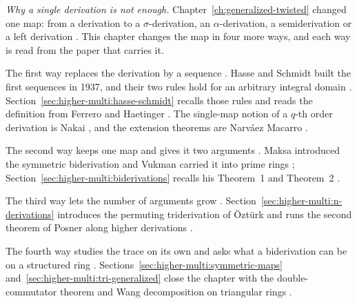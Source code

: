 \emph{Why a single derivation is not enough.} Chapter~\ref{ch:generalized-twisted}
changed one map: from a derivation to a $\sigma$-derivation, an
$\alpha$-derivation, a semiderivation or a left derivation
\cite[p.~2841]{Chuang2017Auto}. This chapter changes the map in four more
ways, and each way is read from the paper that carries it.


The first way replaces the derivation by a sequence
\cite[p.~2323]{FerreroHaetinger2002}. Hasse and Schmidt built the first
sequences in 1937, and their two rules hold for an arbitrary integral domain
\cite[p.~224]{HasseSchmidt1937}. Section~\ref{sec:higher-multi:hasse-schmidt}
recalls those rules and reads the definition from Ferrero and Haetinger
\cite[p.~2323]{FerreroHaetinger2002}. The single-map notion of a $q$-th order
derivation is Nakai \cite[p.~1]{Nakai1970}, and the extension theorems are
Narv\'aez Macarro \cite[pp.~2983--2984]{NarvaezMacarro2009}.

The second way keeps one map and gives it two arguments
\cite[p.~245]{Vukman1989Bid}. Maksa introduced the symmetric biderivation
\cite[references~5 and~6]{Vukman1989Bid} and Vukman carried it into prime
rings \cite[p.~245]{Vukman1989Bid};
Section~\ref{sec:higher-multi:biderivations} recalls his Theorem~1 and
Theorem~2 \cite[pp.~246, 249]{Vukman1989Bid}.

The third way lets the number of arguments grow
\cite[p.~490]{Yazarli2017Trideriv}.
Section~\ref{sec:higher-multi:n-derivations} introduces the permuting
triderivation of Öztürk \cite[reference~10]{Ozturk1999Trideriv} and runs the
second theorem of Posner along higher derivations \cite[p.~9]{Prajapati2021}.

The fourth way studies the trace on its own
\cite[p.~181]{Vukman1990Two} and asks what a biderivation can be on a
structured ring \cite[p.~1952]{Wang2016Bideriv}.
Sections~\ref{sec:higher-multi:symmetric-maps}
and~\ref{sec:higher-multi:tri-generalized} close the chapter with the
double-commutator theorem \cite[p.~187]{Vukman1990Two} and Wang
decomposition on triangular rings \cite[p.~1955]{Wang2016Bideriv}.
